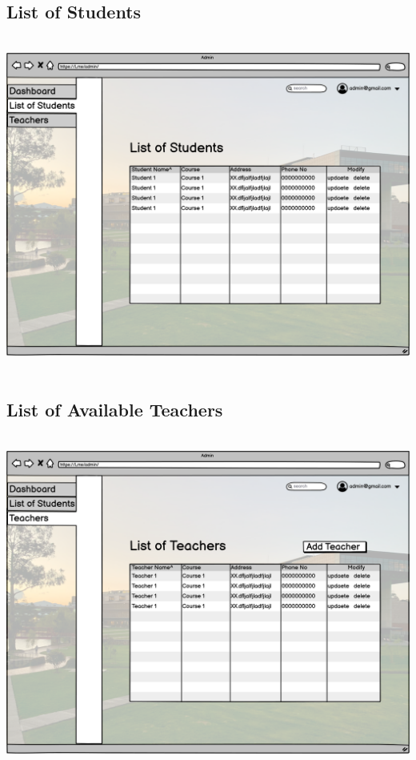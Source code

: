 \subsection{List of Students}

\includegraphics[width=18cm, height=11cm]{HW_1/images/List of Students.png}

\subsection{List of Available Teachers}

\includegraphics[width=18cm, height=11cm]{HW_1/images/Teachers.png}


